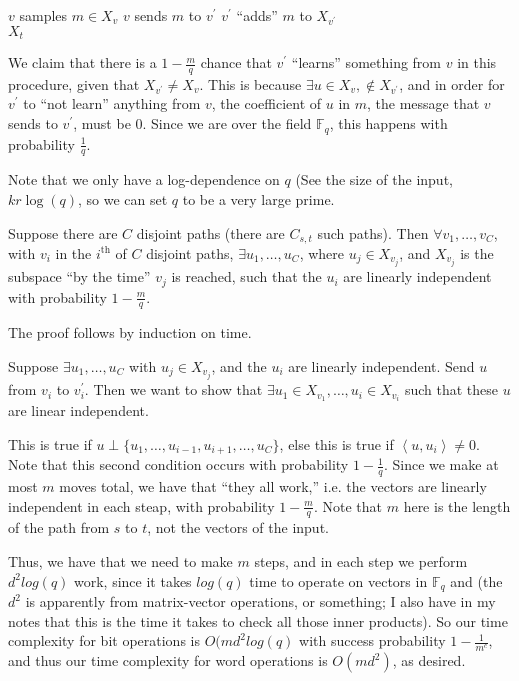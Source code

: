 \documentclass[11pt]{article}
\newcommand{\F}{\mathbb{F}}
\begin{document}
\begin{algorithm}[H]
\begin{algorithmic}
    \State $v$ samples $m \in X_v$
    \State $v$ sends $m$ to $v^\prime$
    \State $v^\prime$ ``adds'' $m$ to $X_{v^\prime}$
  \EndFor \\
  \Return $X_t$
\EndFunction
\end{algorithmic}
\end{algorithm}

We claim that there is a $1 - \frac{m}{q}$ chance that $v^\prime$ ``learns'' something from $v$ in this procedure, given that $X_{v^\prime} \neq X_v$. This is because $\exists u\in X_v, \notin X_{v^\prime}$, and in order for $v^\prime$ to ``not learn'' anything from $v$, the coefficient of $u$ in $m$, the message that $v$ sends to $v^\prime$, must be 0. Since we are over the field $\F_q$, this happens with probability $\frac{1}{q}$.

Note that we only have a log-dependence on $q$ (See the size of the input, $kr\log(q)$, so we can set $q$ to be a very large prime.

Suppose there are $C$ disjoint paths (there are $C_{s,t}$ such paths). Then $\forall v_1, \ldots, v_C$, with $v_i$ in the $i^{\text{th}}$ of $C$ disjoint paths, $\exists u_1, \ldots, u_C$, where $u_j \in X_{v_j}$, and $X_{v_j}$ is the subspace ``by the time'' $v_j$ is reached, such that the $u_i$ are linearly independent with probability $1 - \frac{m}{q}$.

The proof follows by induction on time.

Suppose $\exists u_1, \ldots, u_C$ with $u_j \in X_{v_j}$, and the $u_i$ are linearly independent.  Send $u$ from $v_i$ to $v_i^\prime$. Then we want to show that $\exists u_1 \in X_{v_1}, \ldots, u_i \in X_{v_i}$ such that these $u$ are linear independent.

This is true if $u \perp \{u_1, \ldots, u_{i-1}, u_{i+1}, \ldots, u_C\}$, else this is true if $\left<u, u_i\right> \neq 0$. Note that this second condition occurs with probability $1 - \frac{1}{q}$.  Since we make at most $m$ moves total, we have that ``they all work,'' i.e. the vectors are linearly independent in each steap, with probability $1 - \frac{m}{q}$. Note that $m$ here is the length of the path from $s$ to $t$, not the vectors of the input.

Thus, we have that we need to make $m$ steps, and in each step we perform $d^2log(q)$ work, since it takes $log(q)$ time to operate on vectors in $\F_q$ and (the $d^2$ is apparently from matrix-vector operations, or something; I also have in my notes that this is the time it takes to check all those inner products).  So our time complexity for bit operations is $O(md^2log(q)$ with success probability $1 - \frac{1}{m^c}$, and thus our time complexity for word operations is $O(md^2)$, as desired.
\end{document}
